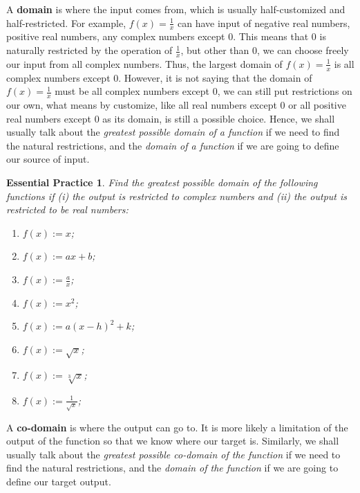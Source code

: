 \documentclass[12pt]{article}
\newtheorem{exercise}{Essential Practice}[subsection]
\begin{document}
    A \textbf{domain} is where the input comes from, which is usually half-customized and half-restricted. For example, $f(x)=\frac{1}{x}$ can have input of negative real numbers, positive real numbers, any complex numbers except 0. This means that 0 is naturally restricted by the operation of $\frac{1}{x}$, but other than 0, we can choose freely our input from all complex numbers. Thus, the largest domain of $f(x)=\frac{1}{x}$ is all complex numbers except 0. However, it is not saying that the domain of $f(x)=\frac{1}{x}$ must be all complex numbers except 0, we can still put restrictions on our own, what means by customize, like all real numbers except 0 or all positive real numbers except 0 as its domain, is still a possible choice. Hence, we shall usually talk about the \textit{greatest possible domain of a function} if we need to find the natural restrictions, and the \textit{domain of a function} if we are going to define our source of input.

    \begin{exercise}
        Find the greatest possible domain of the following functions if (i) the output is restricted to complex numbers and (ii) the output is restricted to be real numbers:\begin{enumerate}
            \item $f(x):=x$;
            \item $f(x):=ax+b$;
            \item $f(x):=\frac{a}{x}$;
            \item $f(x):=x^2$;
            \item $f(x):=a(x-h)^2+k$;
            \item $f(x):=\sqrt{x}$;
            \item $f(x):=\sqrt[3]{x}$;
            \item $f(x):=\frac{1}{\sqrt{x}}$;
        \end{enumerate}
    \end{exercise}

    A \textbf{co-domain} is where the output can go to. It is more likely a limitation of the output of the function so that we know where our target is. Similarly, we shall usually talk about the \textit{greatest possible co-domain of the function} if we need to find the natural restrictions, and the \textit{domain of the function} if we are going to define our target output.
\end{document}
